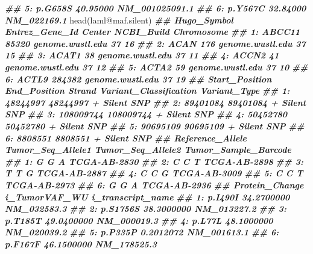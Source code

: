 \documentclass[
  12pt,
  a4paper,
  twoside]{book}
\newenvironment{Shaded}{\begin{snugshade}}{\end{snugshade}}
\newcommand{\DocumentationTok}[1]{\textcolor[rgb]{0.56,0.35,0.01}{\textbf{\textit{#1}}}}
\newcommand{\FunctionTok}[1]{\textcolor[rgb]{0.00,0.00,0.00}{#1}}
\newcommand{\NormalTok}[1]{#1}
\newcommand{\SpecialCharTok}[1]{\textcolor[rgb]{0.00,0.00,0.00}{#1}}
\begin{document}
\begin{Shaded}
\begin{Highlighting}[]
\DocumentationTok{\#\# 5:        p.G658S      40.95000    NM\_001025091.1}
\DocumentationTok{\#\# 6:        p.Y567C      32.84000       NM\_022169.1}
\FunctionTok{head}\NormalTok{(laml}\SpecialCharTok{@}\NormalTok{maf.silent)}
\DocumentationTok{\#\#    Hugo\_Symbol Entrez\_Gene\_Id           Center NCBI\_Build Chromosome}
\DocumentationTok{\#\# 1:      ABCC11          85320 genome.wustl.edu         37         16}
\DocumentationTok{\#\# 2:        ACAN            176 genome.wustl.edu         37         15}
\DocumentationTok{\#\# 3:       ACAT1             38 genome.wustl.edu         37         11}
\DocumentationTok{\#\# 4:       ACCN2             41 genome.wustl.edu         37         12}
\DocumentationTok{\#\# 5:       ACTA2             59 genome.wustl.edu         37         10}
\DocumentationTok{\#\# 6:       ACTL9         284382 genome.wustl.edu         37         19}
\DocumentationTok{\#\#    Start\_Position End\_Position Strand Variant\_Classification Variant\_Type}
\DocumentationTok{\#\# 1:       48244997     48244997      +                 Silent          SNP}
\DocumentationTok{\#\# 2:       89401084     89401084      +                 Silent          SNP}
\DocumentationTok{\#\# 3:      108009744    108009744      +                 Silent          SNP}
\DocumentationTok{\#\# 4:       50452780     50452780      +                 Silent          SNP}
\DocumentationTok{\#\# 5:       90695109     90695109      +                 Silent          SNP}
\DocumentationTok{\#\# 6:        8808551      8808551      +                 Silent          SNP}
\DocumentationTok{\#\#    Reference\_Allele Tumor\_Seq\_Allele1 Tumor\_Seq\_Allele2 Tumor\_Sample\_Barcode}
\DocumentationTok{\#\# 1:                G                 G                 A         TCGA{-}AB{-}2830}
\DocumentationTok{\#\# 2:                C                 C                 T         TCGA{-}AB{-}2898}
\DocumentationTok{\#\# 3:                T                 T                 G         TCGA{-}AB{-}2887}
\DocumentationTok{\#\# 4:                C                 C                 G         TCGA{-}AB{-}3009}
\DocumentationTok{\#\# 5:                C                 C                 T         TCGA{-}AB{-}2973}
\DocumentationTok{\#\# 6:                G                 G                 A         TCGA{-}AB{-}2936}
\DocumentationTok{\#\#    Protein\_Change i\_TumorVAF\_WU i\_transcript\_name}
\DocumentationTok{\#\# 1:        p.I490I    34.2700000       NM\_032583.3}
\DocumentationTok{\#\# 2:       p.S1756S    38.3000000       NM\_013227.2}
\DocumentationTok{\#\# 3:        p.T185T    49.0400000       NM\_000019.3}
\DocumentationTok{\#\# 4:         p.L77L    48.1000000       NM\_020039.2}
\DocumentationTok{\#\# 5:        p.P335P     0.2012072       NM\_001613.1}
\DocumentationTok{\#\# 6:        p.F167F    46.1500000       NM\_178525.3}
\end{Highlighting}
\end{Shaded}
\end{document}
